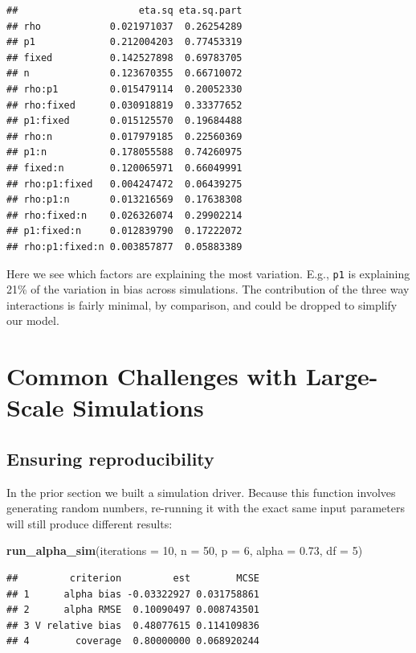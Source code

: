 \documentclass[
]{book}
\newenvironment{Shaded}{\begin{snugshade}}{\end{snugshade}}
\newcommand{\AttributeTok}[1]{\textcolor[rgb]{0.13,0.29,0.53}{#1}}
\newcommand{\DecValTok}[1]{\textcolor[rgb]{0.00,0.00,0.81}{#1}}
\newcommand{\FloatTok}[1]{\textcolor[rgb]{0.00,0.00,0.81}{#1}}
\newcommand{\FunctionTok}[1]{\textcolor[rgb]{0.13,0.29,0.53}{\textbf{#1}}}
\newcommand{\NormalTok}[1]{#1}
\begin{document}
\begin{verbatim}
##                     eta.sq eta.sq.part
## rho            0.021971037  0.26254289
## p1             0.212004203  0.77453319
## fixed          0.142527898  0.69783705
## n              0.123670355  0.66710072
## rho:p1         0.015479114  0.20052330
## rho:fixed      0.030918819  0.33377652
## p1:fixed       0.015125570  0.19684488
## rho:n          0.017979185  0.22560369
## p1:n           0.178055588  0.74260975
## fixed:n        0.120065971  0.66049991
## rho:p1:fixed   0.004247472  0.06439275
## rho:p1:n       0.013216569  0.17638308
## rho:fixed:n    0.026326074  0.29902214
## p1:fixed:n     0.012839790  0.17222072
## rho:p1:fixed:n 0.003857877  0.05883389
\end{verbatim}

Here we see which factors are explaining the most variation. E.g., \texttt{p1} is explaining 21\% of the variation in bias across simulations.
The contribution of the three way interactions is fairly minimal, by comparison, and could be dropped to simplify our model.

\part{Common Challenges with Large-Scale Simulations}\label{part-common-challenges-with-large-scale-simulations}

\chapter{Ensuring reproducibility}\label{sec-reproducability}

In the prior section we built a simulation driver.
Because this function involves generating random numbers, re-running it with the exact same input parameters will still produce different results:

\begin{Shaded}
\begin{Highlighting}[]
\FunctionTok{run\_alpha\_sim}\NormalTok{(}\AttributeTok{iterations =} \DecValTok{10}\NormalTok{, }\AttributeTok{n =} \DecValTok{50}\NormalTok{, }\AttributeTok{p =} \DecValTok{6}\NormalTok{, }\AttributeTok{alpha =} \FloatTok{0.73}\NormalTok{, }\AttributeTok{df =} \DecValTok{5}\NormalTok{)}
\end{Highlighting}
\end{Shaded}

\begin{verbatim}
##         criterion         est        MCSE
## 1      alpha bias -0.03322927 0.031758861
## 2      alpha RMSE  0.10090497 0.008743501
## 3 V relative bias  0.48077615 0.114109836
## 4        coverage  0.80000000 0.068920244
\end{verbatim}
\end{document}
